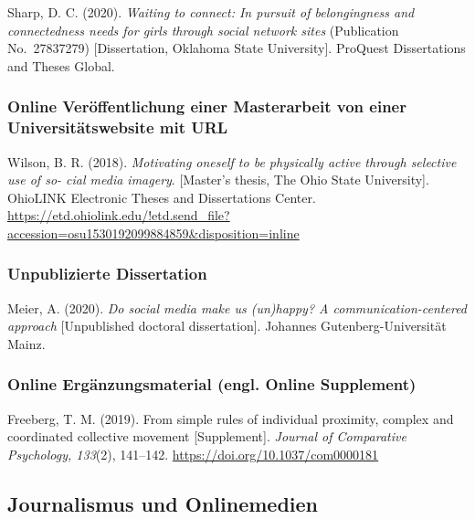 \documentclass[
  letterpaper,
  DIV=11]{scrreprt}
\begin{document}
Sharp, D. C. (2020). \emph{Waiting to connect: In pursuit of
belongingness and connectedness needs for girls through social network
sites} (Publication No.~27837279) {[}Dissertation, Oklahoma State
University{]}. ProQuest Dissertations and Theses Global.

\hypertarget{online-veruxf6ffentlichung-einer-masterarbeit-von-einer-universituxe4tswebsite-mit-url}{%
\subsubsection{Online Veröffentlichung einer Masterarbeit von einer
Universitätswebsite \textbar{} mit
URL}\label{online-veruxf6ffentlichung-einer-masterarbeit-von-einer-universituxe4tswebsite-mit-url}}

Wilson, B. R. (2018). \emph{Motivating oneself to be physically active
through selective use of so- cial media imagery}. {[}Master's thesis,
The Ohio State University{]}. OhioLINK Electronic Theses and
Dissertations Center.
\url{https://etd.ohiolink.edu/!etd.send_file?accession=osu1530192099884859\&disposition=inline}

\hypertarget{unpublizierte-dissertation}{%
\subsubsection{Unpublizierte
Dissertation}\label{unpublizierte-dissertation}}

Meier, A. (2020). \emph{Do social media make us (un)happy? A
communication-centered approach} {[}Unpublished doctoral
dissertation{]}. Johannes Gutenberg-Universität Mainz.

\hypertarget{online-erguxe4nzungsmaterial-engl.-online-supplement}{%
\subsubsection{Online Ergänzungsmaterial (engl. Online
Supplement)}\label{online-erguxe4nzungsmaterial-engl.-online-supplement}}

Freeberg, T. M. (2019). From simple rules of individual proximity,
complex and coordinated collective movement {[}Supplement{]}.
\emph{Journal of Comparative Psychology, 133}(2), 141--142.
\url{https://doi.org/10.1037/com0000181}

\hypertarget{journalismus-und-onlinemedien}{%
\subsection{Journalismus und
Onlinemedien}\label{journalismus-und-onlinemedien}}
\end{document}

